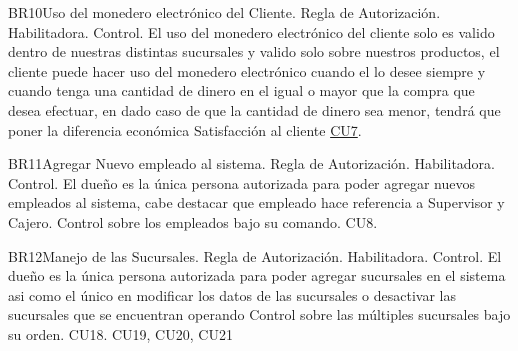 \begin{BussinesRule}{BR10}{Uso del monedero electrónico del Cliente.}
	\BRitem[Tipo:] Regla de Autorización. 
	\BRitem[Clase:] Habilitadora. 
	\BRitem[Nivel:] Control. %
	\BRitem[Descripción:] El uso del monedero electrónico del cliente solo es valido dentro de nuestras distintas sucursales y valido solo sobre nuestros productos, el cliente puede hacer uso del monedero electrónico cuando el lo desee siempre y cuando tenga una cantidad de dinero en el igual o mayor que la compra que desea efectuar, en dado caso de que la cantidad de dinero sea menor, tendrá que poner la diferencia económica 
	\BRitem[Motivación:] Satisfacción al cliente
	 \hyperlink{CU7}{CU7}.
\end{BussinesRule}
\begin{BussinesRule}{BR11}{Agregar Nuevo empleado al sistema.}
	\BRitem[Tipo:] Regla de Autorización. 
	\BRitem[Clase:] Habilitadora. 
	\BRitem[Nivel:] Control. %
	\BRitem[Descripción:] El dueño es la única persona autorizada para poder agregar nuevos empleados al sistema, cabe destacar que empleado hace referencia a Supervisor y Cajero.
	\BRitem[Motivación:] Control sobre los empleados bajo su comando.
	 CU8.
\end{BussinesRule}

\begin{BussinesRule}{BR12}{Manejo de las Sucursales.}
	\BRitem[Tipo:] Regla de Autorización. 
	\BRitem[Clase:] Habilitadora. 
	\BRitem[Nivel:] Control. %
	\BRitem[Descripción:] El dueño es la única persona autorizada para poder agregar sucursales en el sistema asi como el único en modificar los datos de las sucursales  o desactivar las sucursales que se encuentran operando
	\BRitem[Motivación:] Control sobre las múltiples sucursales bajo su orden.
	 CU18. CU19, CU20, CU21
\end{BussinesRule}


